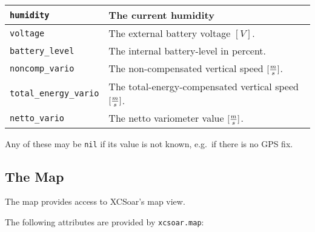 \begin{maxipage}
\begin{tabularx}{1.9\textwidth}{l|X}
\hline

\verb|humidity| & The current humidity \\

\hline

\verb|voltage| & The external battery voltage
$[{V}]$. \\

\hline

\verb|battery_level| & The internal battery-level in percent. \\

\hline

\verb|noncomp_vario| & The non-compensated vertical speed
$[{m \over s}]$. \\

\hline

\verb|total_energy_vario| & The total-energy-compensated vertical speed
$[{m \over s}]$. \\

\hline

\verb|netto_vario| & The netto variometer value
$[{m \over s}]$. \\

\end{tabularx}
\end{maxipage}

Any of these may be \verb|nil| if its value is not known, e.g.\ if
there is no GPS fix.

\subsection{The Map}\label{sec:lua.map}

The map provides access to XCSoar's map view.

The following attributes are provided by \verb|xcsoar.map|:

